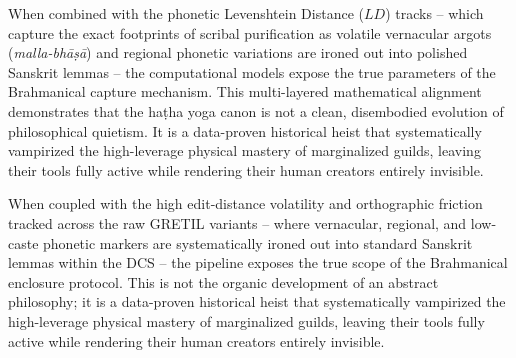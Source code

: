 \documentclass[11pt,twoside,letterpaper]{article}
\begin{document}
When combined with the phonetic Levenshtein Distance ($LD$) tracks -- which capture the exact footprints of scribal purification as volatile vernacular argots (\textit{malla-bhāṣā}) and regional phonetic variations are ironed out into polished Sanskrit lemmas -- the computational models expose the true parameters of the Brahmanical capture mechanism. This multi-layered mathematical alignment demonstrates that the haṭha yoga canon is not a clean, disembodied evolution of philosophical quietism. It is a data-proven historical heist that systematically vampirized the high-leverage physical mastery of marginalized guilds, leaving their tools fully active while rendering their human creators entirely invisible.


When coupled with the high edit-distance volatility and orthographic friction tracked across the raw GRETIL variants -- where vernacular, regional, and low-caste phonetic markers are systematically ironed out into standard Sanskrit lemmas within the DCS -- the pipeline exposes the true scope of the Brahmanical enclosure protocol. This is not the organic development of an abstract philosophy; it is a data-proven historical heist that systematically vampirized the high-leverage physical mastery of marginalized guilds, leaving their tools fully active while rendering their human creators entirely invisible.

\end{document}
